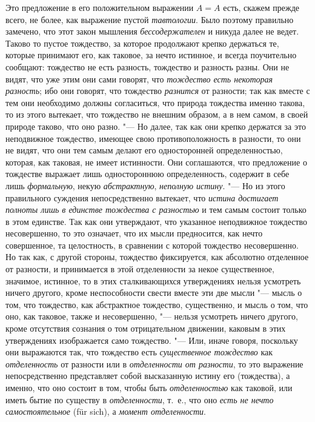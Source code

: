 Это предложение в его положительном выражении $A=A$ есть,
скажем прежде всего, не более, как выражение пустой
{\em тавтологии}. Было поэтому правильно замечено, что
этот закон мышления {\em бессодержателен} и никуда
далее не ведет. Таково то пустое тождество, за которое продолжают крепко
держаться те, которые принимают его, как таковое, за нечто истинное, и
всегда поучительно сообщают: тождество не есть разность, тождество и
разность разны. Они не видят, что уже этим они сами говорят, что
{\em тождество есть некоторая разность}; ибо они
говорят, что тождество {\em разнится} от разности; так
как вместе с тем они необходимо должны согласиться, что природа тождества
именно такова, то из этого вытекает, что тождество не внешним образом, а в
нем самом, в своей природе таково, что оно разно. "--- Но далее, так как они
крепко держатся за это неподвижное тождество, имеющее свою
противоположность в разности, то они не видят, что они тем самым делают его
односторонней определенностью, которая, как таковая, не имеет истинности.
Они соглашаются, что предложение о тождестве выражает лишь одностороннюю
определенность, содержит в себе лишь {\em формальную},
некую {\em абстрактную},
{\em неполную истину}. "--- Но из этого правильного
суждения непосредственно вытекает, что {\em истина
достигает полноты лишь в единстве тождества с разностью} и тем самым
состоит только в этом единстве. Так как они утверждают, что указанное
неподвижное тождество несовершенно, то это означает, что их мысли
предносится, как нечто совершенное, та целостность, в сравнении с которой
тождество несовершенно. Но так как, с другой стороны, тождество
фиксируется, как абсолютно отделенное от разности, и принимается в этой
отделенности за некое существенное, значимое, истинное, то в этих
сталкивающихся утверждениях нельзя усмотреть ничего другого, кроме
неспособности свести вместе эти две мысли "--- мысль о том, что тождество, как
абстрактное тождество, существенно, и мысль о том, что оно, как таковое,
также и несовершенно, "--- нельзя усмотреть ничего другого, кроме отсутствия
сознания о том отрицательном движении, каковым в этих утверждениях
изображается само тождество. "--- Или, иначе говоря, поскольку они выражаются
так, что тождество есть {\em существенное тождество}
как {\em отделенность} от разности или в
{\em отделенности от разности}, то это выражение
непосредственно представляет собой высказанную истину его (тождества), а
именно, что оно состоит в том, чтобы быть
{\em отделенностью} как таковой, или иметь бытие по
существу в {\em отделенности}, т.~е., что оно
{\em есть не нечто самостоятельное} (für sich), а
{\em момент отделенности}.

